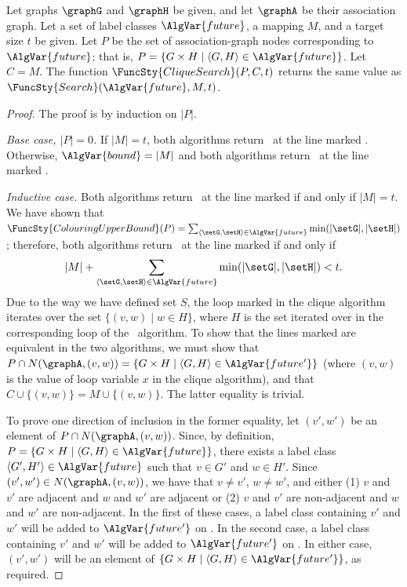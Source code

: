 \begin{proposition}\label{cliqueMcSplitProp}
    Let graphs $\graphG$ and $\graphH$ be given, and let $\graphA$ be their association graph.
    Let a set of label classes $\AlgVar{future}$, a mapping $M$, and a target size $t$ be given.
    Let $P$ be the set of association-graph nodes corresponding to $\AlgVar{future}$; that is,
    $P = \{G \times H \mid \langle G,H \rangle \in \AlgVar{future}\}$.  Let $C = M$.
    The function $\FuncSty{CliqueSearch}(P,C,t)$ returns the same value as
    $\FuncSty{Search}(\AlgVar{future},M,t)$.
\end{proposition}
\begin{proof}
  The proof is by induction on $|P|$.

  \emph{Base case, $|P|=0$.} If $|M| = t$, both algorithms return \boolT\ at
    the line marked .  Otherwise, $\AlgVar{bound} = |M|$ and both
    algorithms return \boolF\ at the line marked .

  \emph{Inductive case.} Both algorithms return \boolT\ at the line marked
     if and only if $|M|=t$.  We have shown that $\FuncSty{ColouringUpperBound}(P) =
    \sum_{\langle \setG,\setH \rangle \in \AlgVar{future}} \min(|\setG|,|\setH|)$; therefore,
    both algorithms return \boolF\ at the line marked  if and only
    if 
\[
    |M| + \sum_{\langle \setG,\setH \rangle \in \AlgVar{future}} \min(|\setG|,|\setH|) < t.
\]
    Due to the way we have defined set $S$, the loop marked  in the clique
    algorithm iterates over the set $\{(v,w) \mid w \in H\}$, where $H$ is the set
    iterated over in the corresponding loop of the \McSplit\ algorithm.  To show that the lines
    marked  are equivalent in the two algorithms, we must show that
    $P \cap N(\graphA, (v,w)) = \{G \times H \mid \langle G,H \rangle \in \AlgVar{future'}\}$
    (where $(v,w)$ is the value of loop variable $x$ in the clique algorithm), and that
    $C \cup \{(v,w)\} = M \cup \{(v,w)\}$.  The latter equality is trivial.

    To prove one direction of inclusion in the former equality, let $(v',w')$
    be an element of $P \cap N(\graphA, (v,w))$.  Since, by definition, $P =
    \{G \times H \mid \langle G,H \rangle \in \AlgVar{future}\}$, there exists
    a label class $\langle G',H' \rangle \in \AlgVar{future}$ such that $v \in
    G'$ and $w \in H'$.  Since $(v',w') \in N(\graphA, (v,w))$, we have that $v
    \not= v'$, $w \not= w'$, and either (1) $v$ and $v'$ are adjacent and $w$
    and $w'$ are adjacent or (2) $v$ and $v'$ are non-adjacent and $w$ and $w'$
    are non-adjacent.  In the first of these cases, a label class containing
    $v'$ and $w'$ will be added to $\AlgVar{future'}$ on
    .  In the second case, a label class
    containing $v'$ and $w'$ will be added to $\AlgVar{future'}$ on
    . In either case, $(v',w')$ will be an
    element of $\{G \times H \mid \langle G,H \rangle \in \AlgVar{future'}\}$,
    as required.


\end{proof}
